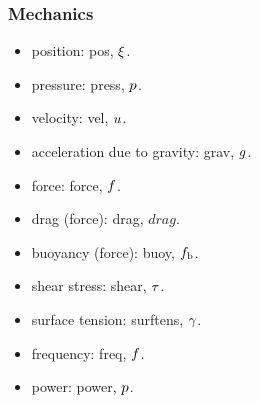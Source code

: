 \subsubsection{Mechanics}
\begin{itemize}
\item position: pos, $\xi$.
\item pressure: press, $p$.
\item velocity: vel, $u$.
\item acceleration due to gravity: grav, $g$.
\item force: force, $f$.
\item drag (force): drag, $drag$.
\item buoyancy (force): buoy, $f_\text{b}$.
\item shear stress: shear, $\tau$.
\item surface tension: surftens, $\gamma$.
\item frequency: freq, $f$.
\item power: power, $p$.
\end{itemize}


